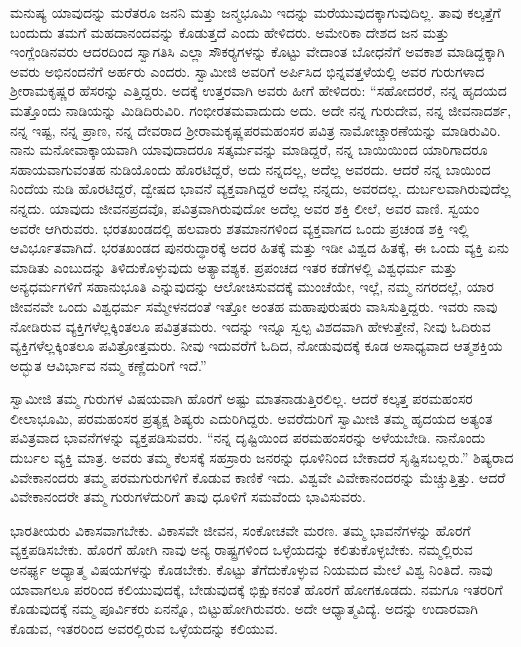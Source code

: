  ಮನುಷ್ಯ ಯಾವುದನ್ನು ಮರೆತರೂ ಜನನಿ ಮತ್ತು ಜನ್ಮಭೂಮಿ ಇದನ್ನು ಮರೆ\-ಯುವುದಕ್ಕಾಗುವುದಿಲ್ಲ. ತಾವು ಕಲ್ಕತ್ತೆಗೆ ಬಂದುದು ತಮಗೆ ಮಹದಾನಂದವನ್ನು ಕೊಡುತ್ತದೆ ಎಂದು ಹೇಳಿದರು. ಅಮೇರಿಕಾ ದೇಶದ ಜನ ಮತ್ತು ಇಂಗ್ಲೆಂಡಿನವರು ಆದರದಿಂದ ಸ್ವಾಗತಿಸಿ ಎಲ್ಲಾ ಸೌಕರ‍್ಯಗಳನ್ನು ಕೊಟ್ಟು ವೇದಾಂತ ಬೋಧನೆಗೆ ಅವಕಾಶ ಮಾಡಿದ್ದಕ್ಕಾಗಿ ಅವರು ಅಭಿನಂದನೆಗೆ ಅರ್ಹರು ಎಂದರು. ಸ್ವಾಮೀಜಿ ಅವರಿಗೆ ಅರ್ಪಿಸಿದ ಭಿನ್ನವತ್ತಳೆಯಲ್ಲಿ ಅವರ ಗುರುಗಳಾದ ಶ‍್ರೀರಾಮಕೃಷ್ಣರ ಹೆಸರನ್ನು ಎತ್ತಿದ್ದರು. ಅದಕ್ಕೆ ಉತ್ತರವಾಗಿ ಅವರು ಹೀಗೆ ಹೇಳಿದರು: “ಸಹೋದರರೆ, ನನ್ನ ಹೃದಯದ ಮತ್ತೊಂದು ನಾಡಿಯನ್ನು ಮಿಡಿದಿರುವಿರಿ. ಗಂಭೀರತಮವಾದುದು ಅದು. ಅದೇ ನನ್ನ ಗುರುದೇವ, ನನ್ನ ಜೀವನಾದರ್ಶ, ನನ್ನ ಇಷ್ಟ, ನನ್ನ ಪ್ರಾಣ, ನನ್ನ ದೇವರಾದ ಶ‍್ರೀರಾಮಕೃಷ್ಣಪರಮಹಂಸರ ಪವಿತ್ರ ನಾಮೋಚ್ಚಾರಣೆಯನ್ನು ಮಾಡಿರುವಿರಿ. ನಾನು ಮನೋವಾಕ್ಕಾಯವಾಗಿ ಯಾವುದಾದರೂ ಸತ್ಕರ್ಮವನ್ನು ಮಾಡಿದ್ದರೆ, ನನ್ನ ಬಾಯಿಯಿಂದ ಯಾರಿಗಾದರೂ ಸಹಾಯವಾಗುವಂತಹ ನುಡಿಯೊಂದು ಹೊರಟಿದ್ದರೆ, ಅದು ನನ್ನದಲ್ಲ, ಅದೆಲ್ಲ ಅವರದು. ಆದರೆ ನನ್ನ ಬಾಯಿಂದ ನಿಂದೆಯ ನುಡಿ ಹೊರಟಿದ್ದರೆ, ದ್ವೇಷದ ಭಾವನೆ ವ್ಯಕ್ತವಾಗಿದ್ದರೆ ಅದೆಲ್ಲ ನನ್ನದು, ಅವರದಲ್ಲ. ದುರ್ಬಲವಾಗಿರುವುದೆಲ್ಲ ನನ್ನದು. ಯಾವುದು ಜೀವನಪ್ರದವೊ, ಪವಿತ್ರವಾಗಿರುವುದೋ ಅದೆಲ್ಲ ಅವರ ಶಕ್ತಿ ಲೀಲೆ, ಅವರ ವಾಣಿ. ಸ್ವಯಂ ಅವರೇ ಆಗಿರುವರು. ಭರತಖಂಡದಲ್ಲಿ ಹಲವಾರು ಶತಮಾನಗಳಿಂದ ವ್ಯಕ್ತವಾಗದ ಒಂದು ಪ್ರಚಂಡ ಶಕ್ತಿ ಇಲ್ಲಿ ಆವಿರ್ಭೂತವಾಗಿದೆ. ಭರತಖಂಡದ ಪುನರುದ್ಧಾರಕ್ಕೆ ಅದರ ಹಿತಕ್ಕೆ ಮತ್ತು ಇಡೀ ವಿಶ್ವದ ಹಿತಕ್ಕೆ, ಈ ಒಂದು ವ್ಯಕ್ತಿ ಏನು ಮಾಡಿತು ಎಂಬುದನ್ನು ತಿಳಿದುಕೊಳ್ಳುವುದು ಅತ್ಯಾವಶ್ಯಕ. ಪ್ರಪಂಚದ ಇತರ ಕಡೆಗಳಲ್ಲಿ ವಿಶ್ವಧರ್ಮ ಮತ್ತು ಅನ್ಯಧರ್ಮಗಳಿಗೆ ಸಹಾನುಭೂತಿ ಎನ್ನುವುದನ್ನು ಆಲೋಚಿಸುವದಕ್ಕೆ ಮುಂಚೆಯೇ, ಇಲ್ಲೆ, ನಮ್ಮ ನಗರದಲ್ಲೆ, ಯಾರ ಜೀವನವೇ ಒಂದು ವಿಶ್ವಧರ್ಮ ಸಮ್ಮೇಳನದಂತೆ ಇತ್ತೋ ಅಂತಹ ಮಹಾಪುರುಷರು ವಾಸಿಸುತ್ತಿದ್ದರು. ಇವರು ನಾವು ನೋಡಿರುವ ವ್ಯಕ್ತಿಗಳೆಲ್ಲಕ್ಕಿಂತಲೂ ಪವಿತ್ರತಮರು. ಇದನ್ನು ಇನ್ನೂ ಸ್ವಲ್ಪ ವಿಶದವಾಗಿ ಹೇಳುತ್ತೇನೆ, ನೀವು ಓದಿರುವ ವ್ಯಕ್ತಿಗಳೆಲ್ಲಕ್ಕಿಂತಲೂ ಪವಿತ್ರೋತ್ತಮರು. ನೀವು ಇದುವರೆಗೆ ಓದಿದ, ನೋಡುವುದಕ್ಕೆ ಕೂಡ ಅಸಾಧ್ಯವಾದ ಆತ್ಮಶಕ್ತಿಯ ಅದ್ಭುತ ಆವಿರ್ಭಾವ ನಮ್ಮ ಕಣ್ಣೆದುರಿಗೆ ಇದೆ.” 

 ಸ್ವಾಮೀಜಿ ತಮ್ಮ ಗುರುಗಳ ವಿಷಯವಾಗಿ ಹೊರಗೆ ಅಷ್ಟು ಮಾತನಾಡುತ್ತಿರಲಿಲ್ಲ. ಆದರೆ ಕಲ್ಕತ್ತ ಪರಮಹಂಸರ ಲೀಲಾಭೂಮಿ, ಪರಮಹಂಸರ ಪ್ರತ್ಯಕ್ಷ ಶಿಷ್ಯರು ಎದುರಿಗಿದ್ದರು. ಅವರೆದುರಿಗೆ ಸ್ವಾಮೀಜಿ ತಮ್ಮ ಹೃದಯದ ಅತ್ಯಂತ ಪವಿತ್ರವಾದ ಭಾವನೆಗಳನ್ನು ವ್ಯಕ್ತಪಡಿಸುವರು. “ನನ್ನ ದೃಷ್ಟಿಯಿಂದ ಪರಮಹಂಸರನ್ನು ಅಳೆಯಬೇಡಿ. ನಾನೊಂದು ದುರ್ಬಲ ವ್ಯಕ್ತಿ ಮಾತ್ರ. ಅವರು ತಮ್ಮ ಕೆಲಸಕ್ಕೆ ಸಹಸ್ರಾರು ಜನರನ್ನು ಧೂಳಿನಿಂದ ಬೇಕಾದರೆ ಸೃಷ್ಟಿಸಬಲ್ಲರು.” ಶಿಷ್ಯರಾದ ವಿವೇಕಾನಂದರು ತಮ್ಮ ಪರಮಗುರುಗಳಿಗೆ ಕೊಡುವ ಕಾಣಿಕೆ ಇದು. ವಿಶ್ವವೇ ವಿವೇಕಾನಂದರನ್ನು ಮೆಚ್ಚುತ್ತಿತ್ತು. ಆದರೆ ವಿವೇಕಾನಂದರೇ ತಮ್ಮ ಗುರುಗಳೆದುರಿಗೆ ತಾವು ಧೂಳಿಗೆ ಸಮವೆಂದು ಭಾವಿಸುವರು. 

 ಭಾರತೀಯರು ವಿಕಾಸವಾಗಬೇಕು. ವಿಕಾಸವೇ ಜೀವನ, ಸಂಕೋಚವೇ ಮರಣ. ತಮ್ಮ ಭಾವನೆಗಳನ್ನು ಹೊರಗೆ ವ್ಯಕ್ತಪಡಿಸಬೇಕು. ಹೊರಗೆ ಹೋಗಿ ನಾವು ಅನ್ಯ ರಾಷ್ಟ್ರಗಳಿಂದ ಒಳ್ಳೆಯದನ್ನು ಕಲಿತುಕೊಳ್ಳಬೇಕು. ನಮ್ಮಲ್ಲಿರುವ ಅನರ್ಘ್ಯ ಅಧ್ಯಾತ್ಮ ವಿಷಯಗಳನ್ನು ಕೊಡಬೇಕು. ಕೊಟ್ಟು ತೆಗೆದುಕೊಳ್ಳುವ ನಿಯಮದ ಮೇಲೆ ವಿಶ್ವ ನಿಂತಿದೆ. ನಾವು ಯಾವಾಗಲೂ ಪರರಿಂದ ಕಲಿಯುವುದಕ್ಕೆ, ಬೇಡುವುದಕ್ಕೆ ಭಿಕ್ಷುಕನಂತೆ ಹೊರಗೆ ಹೋಗಕೂಡದು. ನಮಗೂ ಇತರರಿಗೆ ಕೊಡುವುದಕ್ಕೆ ನಮ್ಮ ಪೂರ್ವಿಕರು ಏನನ್ನೊ, ಬಿಟ್ಟುಹೋಗಿರುವರು. ಅದೇ ಆಧ್ಯಾತ್ಮವಿದ್ಯೆ. ಅದನ್ನು ಉದಾರವಾಗಿ ಕೊಡುವ, ಇತರರಿಂದ ಅವರಲ್ಲಿರುವ ಒಳ್ಳೆಯದನ್ನು ಕಲಿಯುವ. 


